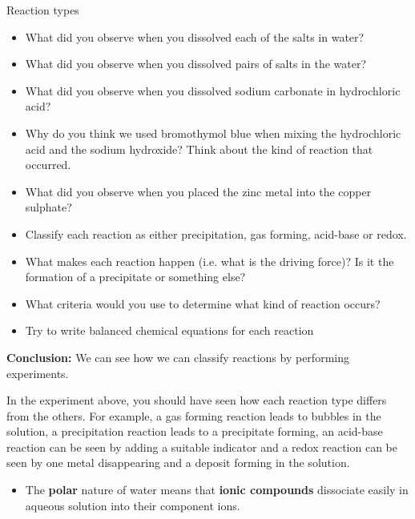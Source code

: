 {{\begin{g_experiment}{Reaction types}
\begin{itemize}[noitemsep]
            \item What did you observe when you dissolved each of the salts in water?\item What did you observe when you dissolved pairs of salts in the water?\item What did you observe when you dissolved sodium carbonate in hydrochloric acid?\item Why do you think we used bromothymol blue when mixing the hydrochloric acid and the sodium hydroxide? Think about the kind of reaction that occurred.\item What did you observe when you placed the zinc metal into the copper sulphate?\item Classify each reaction as either precipitation, gas forming, acid-base or redox.\item What makes each reaction happen (i.e. what is the driving force)? Is it the formation of a precipitate or something else?\item What criteria would you use to determine what kind of reaction occurs?\item Try to write balanced chemical equations for each reaction\end{itemize}
        \par 
\label{m38719*eip-1904}\noindent{}\textbf{Conclusion: }\newline
    We can see how we can classify reactions by performing experiments. 
\par 
\end{g_experiment}
\label{m38719*eip-761}In the experiment above, you should have seen how each reaction type differs from the others. For example, a gas forming reaction leads to bubbles in the solution, a precipitation reaction leads to a precipitate forming, an acid-base reaction can be seen by adding a suitable indicator and a redox reaction can be seen by one metal disappearing and a deposit forming in the solution.\par  
\label{m38719*eip-796}
            \nopagebreak
            \label{m38719*eip-903}\begin{itemize}[noitemsep]
\item The \textbf{polar} nature of water means that \textbf{ionic compounds} dissociate easily in aqueous solution into their component ions.

\end{itemize}}}
